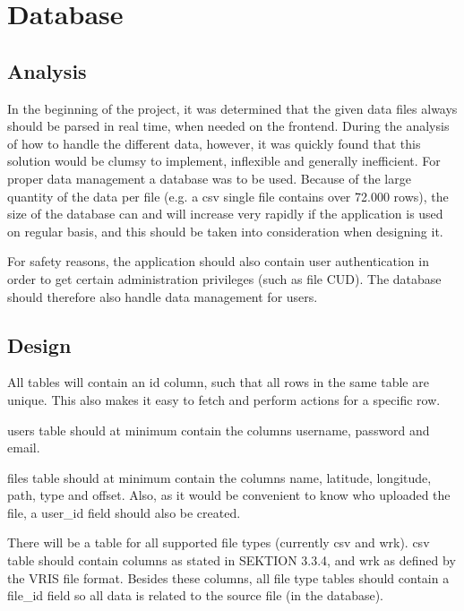 \section{Database}

\subsection{Analysis}

In the beginning of the project, it was determined that the given data files always should be parsed in real time, when needed on the frontend. During the analysis of how to handle the different data, however, it was quickly found that this solution would be clumsy to implement, inflexible and generally inefficient.
For proper data management a database was to be used. Because of the large quantity of the data per file (e.g. a csv single file contains over 72.000 rows), the size of the database can and will increase very rapidly if the application is used on regular basis, and this should be taken into consideration when designing it.

For safety reasons, the application should also contain user authentication in order to get certain administration privileges (such as file CUD). The database should therefore also handle data management for users.

\subsection{Design}
All tables will contain an \textsf{id} column, such that all rows in the same table are unique. This also makes it easy to fetch and perform actions for a specific row.

\textsf{users} table should at minimum contain the columns \textsf{username, password} and \textsf{email}.

\textsf{files} table should at minimum contain the columns \textsf{name, latitude, longitude, path, type} and \textsf{offset}.
Also, as it would be convenient to know who uploaded the file, a \textsf{user\_id} field should also be created.

There will be a table for all supported file types (currently \textsf{csv} and \textsf{wrk}). \textsf{csv} table should contain columns as stated in SEKTION 3.3.4, and \textsf{wrk} as defined by the VRIS file format. Besides these columns, all file type tables should contain a \textsf{file\_id} field so all data is related to the source file (in the database).

